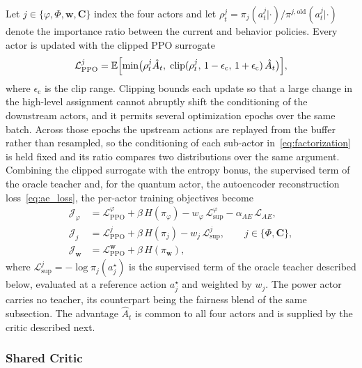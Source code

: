 \documentclass[12pt,onecolumn]{IEEEtran}
\begin{document}
Let $j\in\{\varphi,\Phi,\mathbf{w},\mathbf{C}\}$ index the four actors and let $\rho^{j}_t = \pi_j(a^{j}_t|\cdot)/\pi^{j,\mathrm{old}}(a^{j}_t|\cdot)$ denote the importance ratio between the current and behavior policies. Every actor is updated with the clipped PPO surrogate
\begin{equation}
    \mathcal{L}^{j}_{\mathrm{PPO}}
    =
    \mathbb{E}\Bigl[
      \min\bigl(\rho^{j}_t \hat{A}_t,\;
      \mathrm{clip}(\rho^{j}_t,\,1-\epsilon_{\mathrm c},\,1+\epsilon_{\mathrm c})\,\hat{A}_t\bigr)
    \Bigr],
    \label{eq:ppo}
\end{equation}
where $\epsilon_{\mathrm c}$ is the clip range. 
Clipping bounds each update so that a large change in the high-level assignment cannot abruptly shift the conditioning of the downstream actors, and it permits several optimization epochs over the same batch.
Across those epochs the upstream actions are replayed from the buffer rather than resampled, so the conditioning of each sub-actor in~\eqref{eq:factorization} is held fixed and its ratio compares two distributions over the same argument. 
Combining the clipped surrogate with the entropy bonus, the supervised term of the oracle teacher and, for the quantum actor, the autoencoder reconstruction loss~\eqref{eq:ae_loss}, the per-actor training objectives become
\begin{equation}
\begin{aligned}
    \mathcal{J}_{\varphi}
    &= \mathcal{L}^{\varphi}_{\mathrm{PPO}} + \beta\,H(\pi_\varphi)
       - w_{\varphi}\,\mathcal{L}^{\varphi}_{\mathrm{sup}}
       - \alpha_{AE}\,\mathcal{L}_{AE}, \\[1mm]
    \mathcal{J}_{j}
    &= \mathcal{L}^{j}_{\mathrm{PPO}} + \beta\,H(\pi_j)
       - w_{j}\,\mathcal{L}^{j}_{\mathrm{sup}},
    \qquad j\in\{\Phi,\mathbf{C}\}, \\[1mm]
    \mathcal{J}_{\mathbf{w}}
    &= \mathcal{L}^{\mathbf{w}}_{\mathrm{PPO}} + \beta\,H(\pi_{\mathbf{w}}),
\end{aligned}
    \label{eq:actor_obj}
\end{equation}
where $\mathcal{L}^{j}_{\mathrm{sup}}=-\log\pi_j(a_j^{\star})$ is the supervised term of the oracle teacher described below, evaluated at a reference action $a_j^{\star}$ and weighted by $w_j$.
The power actor carries no teacher, its counterpart being the fairness blend of the same subsection.
The advantage $\hat{A}_t$ is common to all four actors and is supplied by the critic described next.

\subsubsection{Shared Critic}
\end{document}
